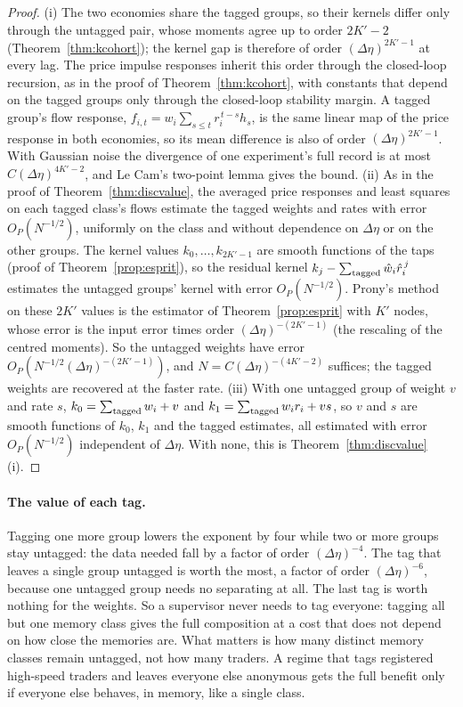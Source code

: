\begin{proof}
(i) The two economies share the tagged groups, so their kernels differ only through the untagged pair, whose moments agree up to order $2K'-2$ (Theorem~\ref{thm:kcohort}); the kernel gap is therefore of order $(\Delta\eta)^{2K'-1}$ at every lag. The price impulse responses inherit this order through the closed-loop recursion, as in the proof of Theorem~\ref{thm:kcohort}, with constants that depend on the tagged groups only through the closed-loop stability margin. A tagged group's flow response, $f_{i,t}=w_i\sum_{s\le t}r_i^{\,t-s}h_s$, is the same linear map of the price response in both economies, so its mean difference is also of order $(\Delta\eta)^{2K'-1}$. With Gaussian noise the divergence of one experiment's full record is at most $C(\Delta\eta)^{4K'-2}$, and Le Cam's two-point lemma gives the bound.
(ii) As in the proof of Theorem~\ref{thm:discvalue}, the averaged price responses and least squares on each tagged class's flows estimate the tagged weights and rates with error $O_P(N^{-1/2})$, uniformly on the class and without dependence on $\Delta\eta$ or on the other groups. The kernel values $k_0,\ldots,k_{2K'-1}$ are smooth functions of the taps (proof of Theorem~\ref{prop:esprit}), so the residual kernel $k_j-\sum_{\rm tagged}\hat w_i\hat r_i^{\,j}$ estimates the untagged groups' kernel with error $O_P(N^{-1/2})$. Prony's method on these $2K'$ values is the estimator of Theorem~\ref{prop:esprit} with $K'$ nodes, whose error is the input error times order $(\Delta\eta)^{-(2K'-1)}$ (the rescaling of the centred moments). So the untagged weights have error $O_P(N^{-1/2}(\Delta\eta)^{-(2K'-1)})$, and $N=C(\Delta\eta)^{-(4K'-2)}$ suffices; the tagged weights are recovered at the faster rate.
(iii) With one untagged group of weight $v$ and rate $s$, $k_0=\sum_{\rm tagged}w_i+v$ and $k_1=\sum_{\rm tagged}w_ir_i+vs$, so $v$ and $s$ are smooth functions of $k_0$, $k_1$ and the tagged estimates, all estimated with error $O_P(N^{-1/2})$ independent of $\Delta\eta$. With none, this is Theorem~\ref{thm:discvalue}(i).
\end{proof}

\paragraph{The value of each tag.} Tagging one more group lowers the exponent by four while two or more groups stay untagged: the data needed fall by a factor of order $(\Delta\eta)^{-4}$. The tag that leaves a single group untagged is worth the most, a factor of order $(\Delta\eta)^{-6}$, because one untagged group needs no separating at all. The last tag is worth nothing for the weights. So a supervisor never needs to tag everyone: tagging all but one memory class gives the full composition at a cost that does not depend on how close the memories are. What matters is how many distinct memory classes remain untagged, not how many traders. A regime that tags registered high-speed traders and leaves everyone else anonymous gets the full benefit only if everyone else behaves, in memory, like a single class.


